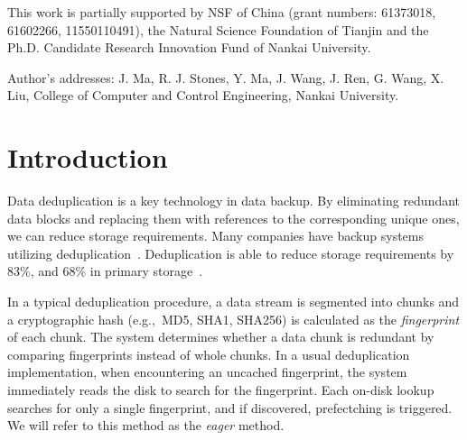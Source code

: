 \documentclass[prodmode,acmtecs]{acmsmall}
\begin{document}

%
%




\begin{bottomstuff}
This work is partially supported by NSF of China (grant numbers: 61373018, 61602266, 11550110491), the Natural Science Foundation of Tianjin and the Ph.D. Candidate Research Innovation Fund of Nankai University.

Author's addresses: J. Ma, R. J. Stones, Y. Ma, J. Wang, J. Ren, G. Wang, X. Liu, College of Computer and Control Engineering, Nankai University.
\end{bottomstuff}

\maketitle

\section{Introduction}

Data deduplication is a key technology in data backup. By eliminating redundant data blocks and replacing them with references to the corresponding unique ones, we can reduce storage requirements. Many companies have backup systems utilizing deduplication~\cite{Paulo2014survey,Meyer2012,quinlan2002venti,zhu2008avoiding,lin2015using}. Deduplication is able to reduce storage requirements by 83\%, and 68\% in primary storage~\cite{meyer2011study}.

In a typical deduplication procedure, a data stream is segmented into chunks and a cryptographic hash (e.g.,\ MD5, SHA1, SHA256) is calculated as the \emph{fingerprint} of each chunk. The system determines whether a data chunk is redundant by comparing fingerprints instead of whole chunks.  In a usual deduplication implementation, when encountering an uncached fingerprint, the system immediately reads the disk to search for the fingerprint.  Each on-disk lookup searches for only a single fingerprint, and if discovered, prefectching is triggered.  We will refer to this method as the \emph{eager} method.
\end{document}
